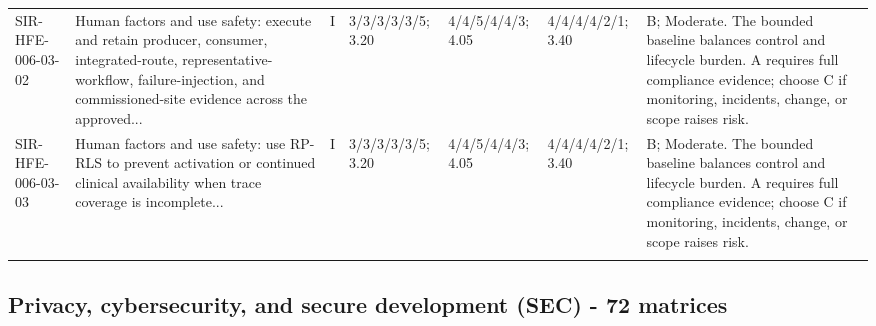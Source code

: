 \documentclass[11pt,letterpaper]{article}
\begin{document}
\begin{scriptsize}
\begin{longtable}{@{}L{0.11\textwidth}L{0.165\textwidth}L{0.04\textwidth}L{0.115\textwidth}L{0.115\textwidth}L{0.115\textwidth}L{0.235\textwidth}@{}}
\addlinespace[2pt]
SIR-HFE-006-03-02 & Human factors and use safety: execute and retain producer, consumer, integrated-route, representative-workflow, failure-injection, and commissioned-site evidence across the approved... & I & 3/3/3/3/3/5; 3.20 & 4/4/5/4/4/3; 4.05 & 4/4/4/4/2/1; 3.40 & B; Moderate. The bounded baseline balances control and lifecycle burden. A requires full compliance evidence; choose C if monitoring, incidents, change, or scope raises risk. \\
\addlinespace[2pt]
SIR-HFE-006-03-03 & Human factors and use safety: use RP-RLS to prevent activation or continued clinical availability when trace coverage is incomplete... & I & 3/3/3/3/3/5; 3.20 & 4/4/5/4/4/3; 4.05 & 4/4/4/4/2/1; 3.40 & B; Moderate. The bounded baseline balances control and lifecycle burden. A requires full compliance evidence; choose C if monitoring, incidents, change, or scope raises risk. \\
\addlinespace[2pt]
\end{longtable}
\end{scriptsize}

\subsection{Privacy, cybersecurity, and secure development (SEC) - 72 matrices}
\end{document}

